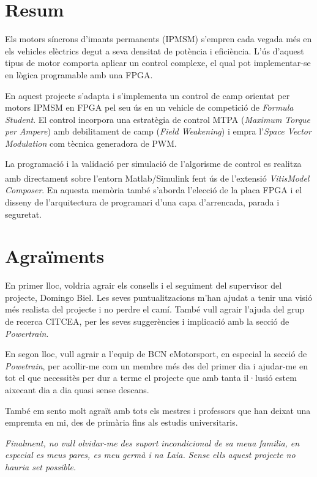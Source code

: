 \documentclass[a4paper,12pt]{article}
\begin{document}
\newpage
\section*{Resum}
{
    Els motors síncrons d'imants permanents (IPMSM) s'empren cada vegada més en
    els vehicles elèctrics degut a seva densitat de potència i eficiència. L'ús
    d'aquest tipus de motor comporta aplicar un control complexe, el qual pot
    implementar-se en lògica programable amb una FPGA.

    En aquest projecte s'adapta i s'implementa un control de camp orientat per
    motors IPMSM en FPGA pel seu ús en un vehicle de competició de
    \emph{Formula Student}. El control incorpora una estratègia de control MTPA
    (\emph{Maximum Torque per Ampere}) amb debilitament de camp (\emph{Field
    Weakening}) i empra l'\emph{Space Vector Modulation} com tècnica generadora
    de PWM.

    La programació i la validació per simulació de l'algorisme de control es
    realitza amb directament sobre l'entorn
    Matlab/Simulink\textsuperscript{\textregistered} fent ús de l'extensió
    \emph{Vitis\texttrademark Model Composer}. En aquesta memòria també
    s'aborda l'elecció de la placa FPGA i el disseny de l'arquitectura de
    programari d'una capa d'arrencada, parada i seguretat.
}



\newpage
\section* {Agraïments} 
{
    En primer lloc, voldria agrair els consells i el seguiment del supervisor
    del projecte, Domingo Biel. Les seves puntualitzacions m'han ajudat a tenir
    una visió més realista del projecte i no perdre el camí. També vull agrair
    l'ajuda del grup de recerca CITCEA, per les seves suggerències i implicació
    amb la secció de \emph{Powertrain}.

    En segon lloc, vull agrair a l'equip de BCN eMotorsport, en especial la
    secció de \emph{Powetrain}, per acollir-me com un membre més des del primer
    dia i ajudar-me en tot el que necessitès per dur a terme el projecte que
    amb tanta il·lusió estem aixecant dia a dia quasi sense descans.

    També em sento molt agraït amb tots els mestres i professors que han deixat
    una empremta en mi, des de primària fins als estudis universitaris.

    \emph{Finalment, no vull olvidar-me des suport incondicional de sa meua familia,
    en especial es meus pares, es meu germà i na Laia. Sense ells aquest
    projecte no hauria set possible.}
}
\end{document}
